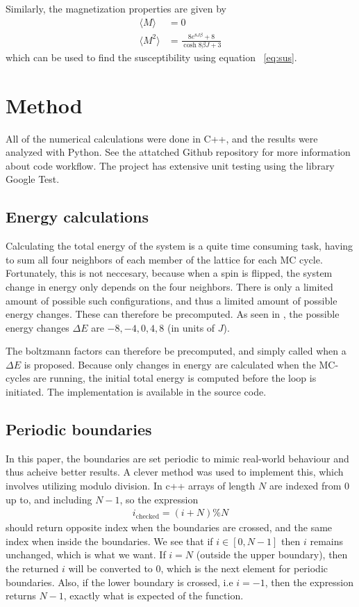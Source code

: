 \documentclass[aps,reprint]{revtex4-1}
\newcommand{\mean}[1]{\langle #1 \rangle}
\begin{document}
Similarly, the magnetization properties are given by
\begin{align*}
  \mean{M} &= 0 \\
  \mean{M^2} &= \frac{8e^{8 J \beta} + 8}{\cosh{8\beta J} + 3}
\end{align*}
which can be used to find the susceptibility using equation ~\ref{eq:sus}.

\section{Method} \label{sec:method}
All of the numerical calculations were done in C++, and the results were analyzed
with Python. See the attatched Github repository for more information about code workflow.
The project has extensive unit testing using the library Google Test.
\subsection{Energy calculations}
Calculating the total energy of the system is a quite time consuming task, having
to sum all four neighbors of each member of the lattice for each MC cycle. Fortunately,
this is not neccesary, because when a spin is flipped, the system change in energy
only depends on the four neighbors. There is only a limited amount of possible
such configurations, and thus a limited amount of possible energy changes. These
can therefore be precomputed. As seen in \cite{mortenjensen}, the possible
energy changes $\Delta E$ are $-8, -4, 0, 4, 8$ (in units of $J$).

The boltzmann factors can therefore be precomputed, and simply called when a $\Delta E$
is proposed. Because only changes in energy are calculated when the MC-cycles
are running, the initial total energy is computed before the loop is initiated.
The implementation is available in the source code.
\subsection{Periodic boundaries}
In this paper, the boundaries are set periodic to mimic real-world behaviour and
thus acheive better results. A clever method was used to implement this, which
involves utilizing modulo division. In c++ arrays of length $N$ are indexed from
$0$ up to, and including $N-1$, so the expression
\begin{align*}
  i_\text{checked} = (i + N) \% N
\end{align*}
should return opposite index when the boundaries are crossed, and the same
index when inside the boundaries. We see that if $i \in [0, N-1]$ then $i$
remains unchanged, which is what we want. If $i = N$ (outside the upper boundary),
then the returned $i$ will be converted to $0$, which is the next element for
periodic boundaries. Also, if the lower boundary is crossed, i.e $i = -1$, then
the expression returns $N - 1$, exactly what is expected of the function.
\end{document}
